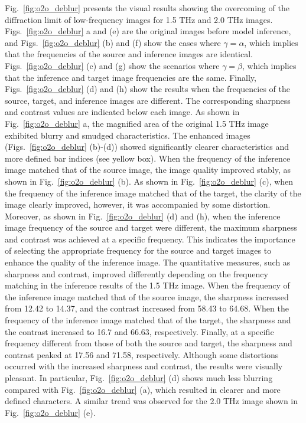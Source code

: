 Fig.~\ref{fig:o2o_deblur} presents the visual results showing the overcoming of the diffraction limit of low-frequency images for 1.5 THz and 2.0 THz images. Figs.~\ref{fig:o2o_deblur} a and (e) are the original images before model inference, and Figs.~\ref{fig:o2o_deblur} (b) and (f) show the cases where $\gamma=\alpha$, which implies that the frequencies of the source and inference images are identical. Figs.~\ref{fig:o2o_deblur} (c) and (g) show the scenarios where $\gamma=\beta$, which implies that the inference and target image frequencies are the same. Finally, Figs.~\ref{fig:o2o_deblur} (d) and (h) show the results when the frequencies of the source, target, and inference images are different. The corresponding sharpness and contrast values are indicated below each image. As shown in Fig.~\ref{fig:o2o_deblur} a, the magnified area of the original 1.5 THz image exhibited blurry and smudged characteristics. The enhanced images (Figs.~\ref{fig:o2o_deblur} (b)-(d)) showed significantly clearer characteristics and more defined bar indices (see yellow box).  When the frequency of the inference image matched that of the source image, the image quality improved stably, as shown in Fig.~\ref{fig:o2o_deblur} (b). As shown in Fig.~\ref{fig:o2o_deblur} (c), when the frequency of the inference image matched that of the target, the clarity of the image clearly improved, however, it was accompanied by some distortion. Moreover, as shown in Fig.~\ref{fig:o2o_deblur} (d) and (h), when the inference image frequency of the source and target were different, the maximum sharpness and contrast was achieved at a specific frequency. This indicates the importance of selecting the appropriate frequency for the source and target images to enhance the quality of the inference image. The quantitative measures, such as sharpness and contrast, improved differently depending on the frequency matching in the inference results of the 1.5 THz image. When the frequency of the inference image matched that of the source image, the sharpness increased from 12.42 to 14.37, and the contrast increased from 58.43 to 64.68. When the frequency of the inference image matched that of the target, the sharpness and the contrast increased to 16.7 and 66.63, respectively. Finally, at a specific frequency different from those of both the source and target, the sharpness and contrast peaked at 17.56 and 71.58, respectively. Although some distortions occurred with the increased sharpness and contrast, the results were visually pleasant. In particular, Fig.~\ref{fig:o2o_deblur} (d) shows much less blurring compared with Fig.~\ref{fig:o2o_deblur} (a), which resulted in clearer and more defined characters. A similar trend was observed for the 2.0 THz image shown in Fig.~\ref{fig:o2o_deblur} (e).
